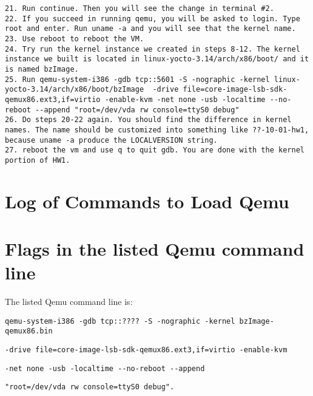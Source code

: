 \documentclass[letterpaper,10pt,titlepage]{article}
\begin{document}
\begin{lstlisting}
21.	Run continue. Then you will see the change in terminal #2. 
22.	If you succeed in running qemu, you will be asked to login. Type root and enter. Run uname -a and you will see that the kernel name.
23.	Use reboot to reboot the VM.
24.	Try run the kernel instance we created in steps 8-12. The kernel instance we built is located in linux-yocto-3.14/arch/x86/boot/ and it is named bzImage.
25.	Run qemu-system-i386 -gdb tcp::5601 -S -nographic -kernel linux-yocto-3.14/arch/x86/boot/bzImage  -drive file=core-image-lsb-sdk-qemux86.ext3,if=virtio -enable-kvm -net none -usb -localtime --no-reboot --append "root=/dev/vda rw console=ttyS0 debug"
26.	Do steps 20-22 again. You should find the difference in kernel names. The name should be customized into something like ??-10-01-hw1, because uname -a produce the LOCALVERSION string.
27.	reboot the vm and use q to quit gdb. You are done with the kernel portion of HW1.
\end{lstlisting}

\section{Log of Commands to Load Qemu}

\section{Flags in the listed Qemu command line}
The listed Qemu command line is:
\begin{lstlisting}
qemu-system-i386 -gdb tcp::???? -S -nographic -kernel bzImage-qemux86.bin 
\end{lstlisting}
\begin{lstlisting}
-drive file=core-image-lsb-sdk-qemux86.ext3,if=virtio -enable-kvm 
\end{lstlisting}
\begin{lstlisting}
-net none -usb -localtime --no-reboot --append 
\end{lstlisting}
\begin{lstlisting}
"root=/dev/vda rw console=ttyS0 debug".
\end{lstlisting}
\end{document}
